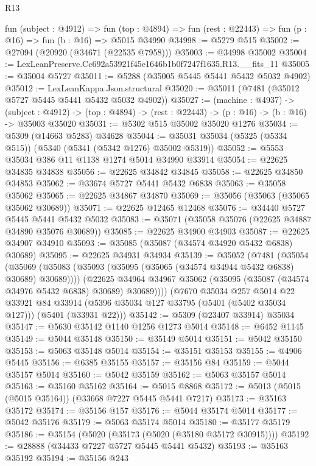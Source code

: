 \begin{lexlean}{R13}
\begin{coremodule}
  fun (subject : @4912) =>
  fun (top : @4894) => fun (rest : @22443) => fun (p : @16) => fun (b : @16) => @5015 @34990
@34998 := @5279 @515
@35002 := @27094 (@20920 (@34671 (@22535 @7958)))
@35003 := @34998 @35002
@35004 := LexLeanPreserve.Cc692a53921f45e1646b1b0f7247f1635.R13.__fits_11
@35005 := @35004 @5727
@35011 := @5288 (@35005 @5445 @5441 @5432 @5032 @4902)
@35012 := LexLeanKappa.Json.structural
@35020 := @35011 (@7481 (@35012 @5727 @5445 @5441 @5432 @5032 @4902))
@35027 := (machine : @4937) ->
  (subject : @4912) -> (top : @4894) -> (rest : @22443) -> (p : @16) -> (b : @16) -> @35003 @35020
@35031 := @5302 @515 @35002 @35020 @1276
@35034 := @5309 (@14663 @5283) @34628
@35044 := @35031 @35034 (@5325 (@5334 @515)) (@5340 (@5341 (@5342 @1276) @35002 @5319))
@35052 := @5553 @35034 @386 @11 @1138 @1274 @5014 @34990 @33914
@35054 := @22625 @34835 @34838
@35056 := @22625 @34842 @34845
@35058 := @22625 @34850 @34853
@35062 := @33674 @5727 @5441 @5432 @6838
@35063 := @35058 @35062
@35065 := @22625 @34867 @34870
@35069 := @35056 (@35063 (@35065 @35062 @30689))
@35071 := @22625 @12465 @12468
@35076 := @34440 @5727 @5445 @5441 @5432 @5032
@35083 := @35071 (@35058 @35076 (@22625 @34887 @34890 @35076 @30689))
@35085 := @22625 @34900 @34903
@35087 := @22625 @34907 @34910
@35093 := @35085 (@35087 (@34574 @34920 @5432 @6838) @30689)
@35095 := @22625 @34931 @34934
@35139 := @35052
    (@7481
      (@35054
        (@35069 (@35083 (@35093 (@35095 (@35065 (@34574 @34944 @5432 @6838) @30689) @30689))))
        (@22625 @34964 @34967 @35062 (@35095 (@35087 (@34574 @34976 @5432 @6838) @30689) @30689))))
    (@7670
      @35034
      @257
      @5014
      @22
      @33921
      @84
      @33914
      (@5396 @35034 @127 @33795 (@5401 (@5402 @35034 @127)))
      (@5401 (@33931 @22)))
@35142 := @5309 (@23407 @33914) @35034
@35147 := @5630 @35142 @1140 @1256 @1273 @5014
@35148 := @6452 @1145
@35149 := @5044 @35148
@35150 := @35149 @5014
@35151 := @5042 @35150
@35153 := @5063 @35148 @5014
@35154 := @35151 @35153
@35155 := @4906 @5445
@35156 := @6385 @35155
@35157 := @35156 @84
@35159 := @5044 @35157 @5014
@35160 := @5042 @35159
@35162 := @5063 @35157 @5014
@35163 := @35160 @35162
@35164 := @5015 @8868
@35172 := @5013 (@5015 (@5015 @35164)) (@33668 @7227 @5445 @5441 @7217)
@35173 := @35163 @35172
@35174 := @35156 @157
@35176 := @5044 @35174 @5014
@35177 := @5042 @35176
@35179 := @5063 @35174 @5014
@35180 := @35177 @35179
@35186 := @35154 (@5020 (@35173 (@5020 (@35180 @35172 @30915))))
@35192 := @28888 (@34433 @7227 @5727 @5445 @5441 @5432)
@35193 := @35163 @35192
@35194 := @35156 @243

\end{coremodule}
\end{lexlean}
